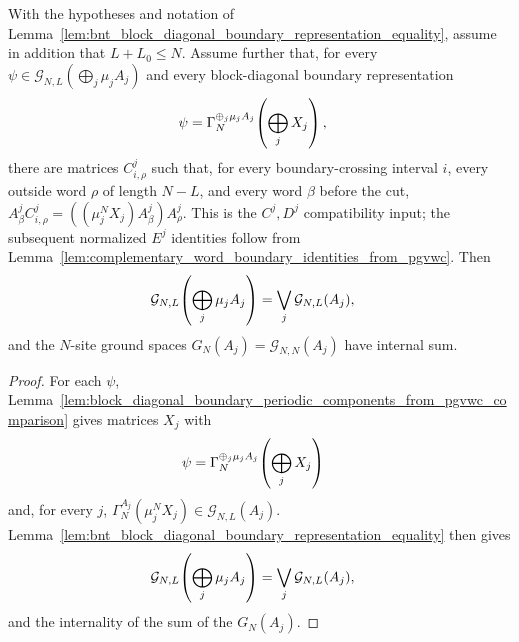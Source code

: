 \begin{lemma}
    \label{lem:bnt_block_diagonal_pgvwc_comparison_equality}
    \leanok
    With the hypotheses and notation of
    Lemma~\ref{lem:bnt_block_diagonal_boundary_representation_equality}, assume
    in addition that $L+L_0\le N$. Assume further that, for every
    $\psi\in\mathcal G_{N,L}\!\left(\bigoplus_j\mu_jA_j\right)$
    and every block-diagonal boundary representation
    \begin{align}
        \psi
         & =
        \Gamma_N^{\oplus_j\mu_jA_j}\!\left(\bigoplus_jX_j\right),
        \notag
    \end{align}
    there are matrices $C^j_{i,\rho}$ such that, for every
    boundary-crossing interval $i$, every outside word $\rho$ of length $N-L$,
    and every word $\beta$ before the cut,
    $A^j_\beta C^j_{i,\rho} = ((\mu_j^N X_j)A^j_\beta)A^j_\rho$.
    This is the $C^j,D^j$ compatibility input; the subsequent normalized
    $E^j$ identities follow from
    Lemma~\ref{lem:complementary_word_boundary_identities_from_pgvwc}.
    Then
    \begin{align}
        \mathcal G_{N,L}\!\left(\bigoplus_j\mu_jA_j\right)
         & =
        \bigvee_j\mathcal G_{N,L}(A_j),
        \notag
    \end{align}
    and the $N$-site ground spaces $G_N(A_j)=\mathcal G_{N,N}(A_j)$
    have internal sum.
\end{lemma}

\begin{proof}
    \leanok
    For each $\psi$,
    Lemma~\ref{lem:block_diagonal_boundary_periodic_components_from_pgvwc_comparison}
    gives matrices $X_j$ with
    \begin{align}
        \psi
         & =
        \Gamma_N^{\oplus_j\mu_jA_j}\!\left(\bigoplus_jX_j\right)
        \notag
    \end{align}
    and, for every $j$,
    $\Gamma_N^{A_j}(\mu_j^N X_j)\in\mathcal G_{N,L}(A_j)$.
    Lemma~\ref{lem:bnt_block_diagonal_boundary_representation_equality}
    then gives
    \begin{align}
        \mathcal G_{N,L}\!\left(\bigoplus_j\mu_jA_j\right)
         & =
        \bigvee_j\mathcal G_{N,L}(A_j),
        \notag
    \end{align}
    and the internality of the sum of the $G_N(A_j)$.
\end{proof}

